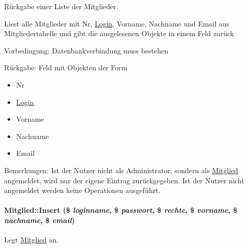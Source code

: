 Rückgabe einer Liste der Mitglieder. 

Liest alle Mitglieder mit Nr, \hyperlink{classLogin}{Login}, Vorname, Nachname und Email aus Mitgliedertabelle und gibt die ausgelesenen Objekte in einem Feld zurück \begin{Desc}
\item[Vorbedingung:]Datenbankverbindung muss bestehen \end{Desc}
\begin{Desc}
\item[R\"{u}ckgabe:]Feld mit Objekten der Form\begin{itemize}
\item Nr\item \hyperlink{classLogin}{Login}\item Vorname\item Nachname\item Email \end{itemize}
\end{Desc}
\begin{Desc}
\item[Bemerkungen:]Ist der Nutzer nicht als Administrator, sondern als \hyperlink{classMitglied}{Mitglied} angemeldet, wird nur der eigene Eintrag zurückgegeben. Ist der Nutzer nicht angemeldet werden keine Operationen ausgeführt. \end{Desc}
\hypertarget{classMitglied_5d9d5d087779303f002cbbcfcf1735c1}{
\paragraph[Insert]{\setlength{\rightskip}{0pt plus 5cm}Mitglied::Insert (\$ {\em loginname}, \$ {\em passwort}, \$ {\em rechte}, \$ {\em vorname}, \$ {\em nachname}, \$ {\em email})}\hfill}
\label{classMitglied_5d9d5d087779303f002cbbcfcf1735c1}


Legt \hyperlink{classMitglied}{Mitglied} an. 

